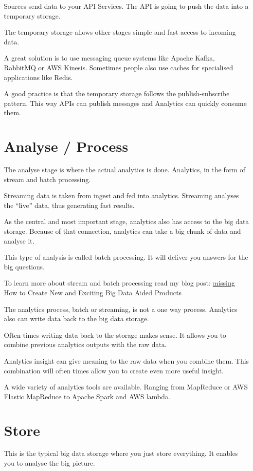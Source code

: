 \documentclass[12pt, numbers=noenddot]{scrreprt} %
\begin{document}
Sources send data to your API Services. The API is going to push the data into a temporary storage.

The temporary storage allows other stages simple and fast access to incoming data.

A great solution is to use messaging queue systems like Apache Kafka, RabbitMQ or AWS Kinesis. Sometimes people also use caches for specialised applications like Redis.

A good practice is that the temporary storage follows the publish-subscribe pattern. This way APIs can publish messages and Analytics can quickly consume them.

\section{Analyse / Process}
The analyse stage is where the actual analytics is done. Analytics, in the form of stream and batch processing.

Streaming data is taken from ingest and fed into analytics. Streaming analyses the “live” data, thus generating fast results.

As the central and most important stage, analytics also has access to the big data storage. Because of that connection, analytics can take a big chunk of data and analyse it.

This type of analysis is called batch processing. It will deliver you answers for the big questions.

To learn more about stream and batch processing read my blog post: \url{missing} How to Create New and Exciting Big Data Aided Products

The analytics process, batch or streaming, is not a one way process. Analytics also can write data back to the big data storage.

Often times writing data back to the storage makes sense. It allows you to combine previous analytics outputs with the raw data.

Analytics insight can give meaning to the raw data when you combine them. This combination will often times allow you to create even more useful insight.

A wide variety of analytics tools are available. Ranging from MapReduce or AWS Elastic MapReduce to Apache Spark and AWS lambda.

\section{Store}
This is the typical big data storage where you just store everything. It enables you to analyse the big picture.
\end{document}
